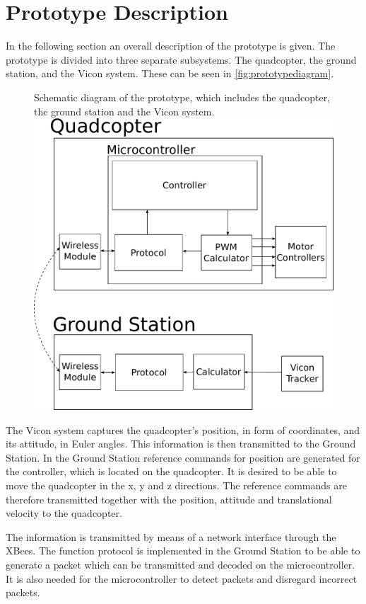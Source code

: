 \section{Prototype Description}\label{sec:PrototypeDescription}
In the following section an overall description of the prototype is given. %
The prototype is divided into three separate subsystems. The quadcopter, the ground station, and the Vicon system. These can be seen in \autoref{fig:prototypediagram}. 

\begin{figure}[H]
  \centering
  \captionbox
  {
    Schematic diagram of the prototype, which includes the quadcopter, the ground station and the Vicon system.
    \label{fig:prototypediagram}
  }
  {
    \includegraphics[width=.5\textwidth]{figures/prototypediagram}
  }
\end{figure}
The Vicon system captures the quadcopter's position, in form of coordinates, and its attitude, in Euler angles. This information is then transmitted to the Ground Station. In the Ground Station reference commands for position are generated for the controller, which is located on the quadcopter. It is desired to be able to move the quadcopter in the x, y and z directions. The reference commands are therefore transmitted together with the position, attitude and translational velocity to the quadcopter.

The information is transmitted by means of a network interface through the XBees. The function protocol is implemented in the Ground Station to be able to generate a packet which can be transmitted and decoded on the microcontroller. It is also needed for the microcontroller to detect packets and disregard incorrect packets.

